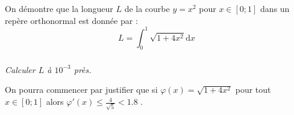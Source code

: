 \documentclass[10pt,oneside]{article}
\begin{document}
\hfill
\begin{minipage}{12cm}
On démontre que la longueur $L$ de la courbe $y=x^2$ pour $x\in[0;1]$ dans un repère orthonormal est donnée par :
$$L=\int_0^1\sqrt{1+4x^2}\text{d}x$$

\subparagraph*{}\textit{Calculer $L$ à $10^{-3}$ près.}

\medskip

On pourra commencer par justifier que si $\varphi(x)=\sqrt{1+4x^2}$ pour tout $x\in[0;1]$ alors $\varphi'(x)\leq\frac{4}{\sqrt{5}}<1.8$ .
\end{minipage}\hfill\hbox{}
\end{document}
